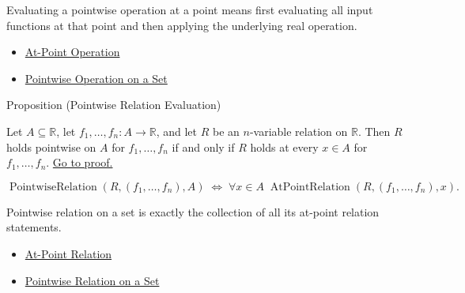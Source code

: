 \begin{remark*}[Interpretation]
Evaluating a pointwise operation at a point means first evaluating all input
functions at that point and then applying the underlying real operation.
\end{remark*}

\begin{dependencies}
\begin{itemize}
  \item \hyperref[def:at-point-operation]{At-Point Operation}
  \item \hyperref[def:pointwise-operation-on-set]{Pointwise Operation on a Set}
\end{itemize}
\end{dependencies}

\begin{propositionbox}{Proposition (Pointwise Relation Evaluation)}
\begin{proposition}
\label{prop:pointwise-relation-evaluation}
Let \(A\subseteq\mathbb{R}\), let \(f_1,\ldots,f_n:A\to\mathbb{R}\),
and let \(R\) be an \(n\)-variable relation on \(\mathbb{R}\).  Then
\(R\) holds pointwise on \(A\) for \(f_1,\ldots,f_n\) if and only if
\(R\) holds at every \(x\in A\) for \(f_1,\ldots,f_n\).
\hyperref[prf:pointwise-relation-evaluation]{Go to proof.}
\end{proposition}
\end{propositionbox}

\begin{remark*}
\[
  \operatorname{PointwiseRelation}(R,(f_1,\ldots,f_n),A)
  \;\Longleftrightarrow\;
  \forall x\in A\;\operatorname{AtPointRelation}(R,(f_1,\ldots,f_n),x).
\]
\end{remark*}

\begin{remark*}[Interpretation]
Pointwise relation on a set is exactly the collection of all its at-point
relation statements.
\end{remark*}

\begin{dependencies}
\begin{itemize}
  \item \hyperref[def:at-point-relation]{At-Point Relation}
  \item \hyperref[def:pointwise-relation-on-set]{Pointwise Relation on a Set}
\end{itemize}
\end{dependencies}

